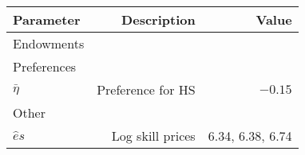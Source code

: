 \begin{tabular}{lrr}
\hline
Parameter & Description  & Value  \\ 
\hline
Endowments &   &   \\ 
Preferences &   &   \\ 
$\bar{\eta}$ & Preference for HS  & $-0.15$  \\ 
Other &   &   \\ 
$\hat{e}{s}$ & Log skill prices  & 6.34, 6.38, 6.74  \\ 
\hline
\end{tabular}%
